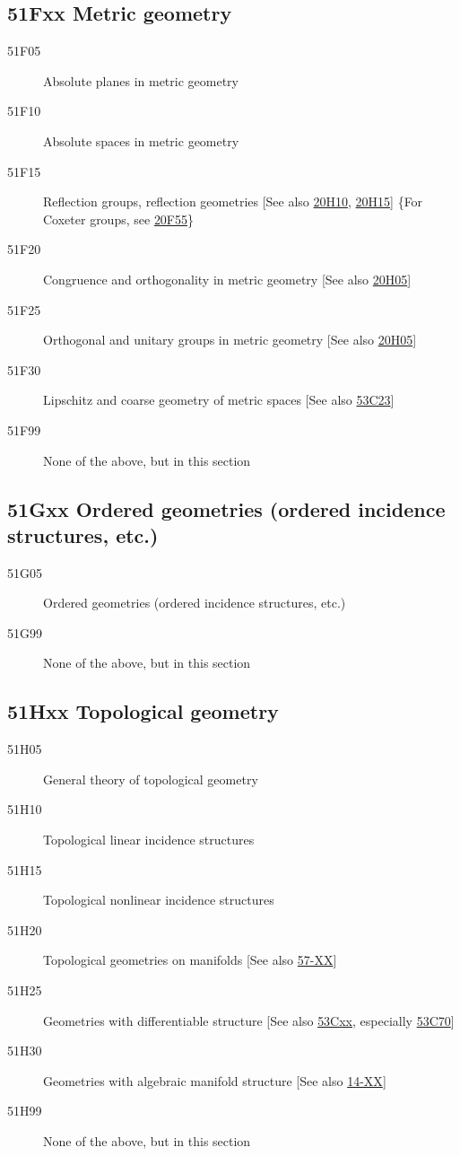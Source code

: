 \subsection*{51Fxx  Metric geometry }\label{51Fxx}
\begin{description}  
\item [51F05]\label{51F05} Absolute planes in metric geometry
\item [51F10]\label{51F10} Absolute spaces in metric geometry
\item [51F15]\label{51F15} Reflection groups, reflection geometries [See also \hyperref[20H10]{20H10}, \hyperref[20H15]{20H15}] \{For Coxeter groups, see \hyperref[20F55]{20F55}\}
\item [51F20]\label{51F20} Congruence and orthogonality in metric geometry [See also \hyperref[20H05]{20H05}]
\item [51F25]\label{51F25} Orthogonal and unitary groups  in metric geometry [See also \hyperref[20H05]{20H05}]
\item [51F30]\label{51F30} Lipschitz and coarse geometry of metric spaces [See also \hyperref[53C23]{53C23}]
\item [51F99]\label{51F99} None of the above, but in this section
\end{description}
\subsection*{51Gxx  Ordered geometries (ordered incidence structures, etc.) }\label{51Gxx}
\begin{description}  
\item [51G05]\label{51G05} Ordered geometries (ordered incidence structures, etc.)
\item [51G99]\label{51G99} None of the above, but in this section
\end{description}
\subsection*{51Hxx  Topological geometry }\label{51Hxx}
\begin{description}  
\item [51H05]\label{51H05} General theory of topological geometry
\item [51H10]\label{51H10} Topological linear incidence structures
\item [51H15]\label{51H15} Topological nonlinear incidence structures
\item [51H20]\label{51H20} Topological geometries on manifolds [See also \hyperref[57-XX]{57-XX}]
\item [51H25]\label{51H25} Geometries with differentiable structure [See also \hyperref[53Cxx]{53Cxx}, especially  \hyperref[53C70]{53C70}]
\item [51H30]\label{51H30} Geometries with algebraic manifold structure [See also \hyperref[14-XX]{14-XX}]
\item [51H99]\label{51H99} None of the above, but in this section
\end{description}
